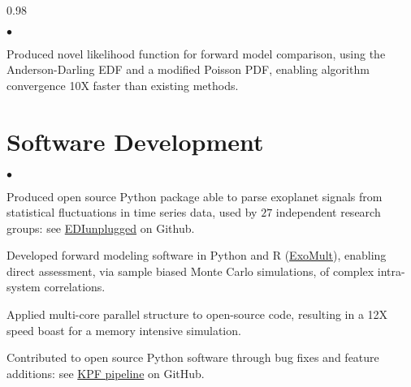 \documentclass[margin,line, 12pt]{res}
\newenvironment{list2}{
  \begin{list}{$\bullet$}{%
      \setlength{\itemsep}{0.04in}
      \setlength{\parsep}{0.00in} \setlength{\parskip}{0in}
      \setlength{\topsep}{0.0in} \setlength{\partopsep}{0in}
      \setlength{\leftmargin}{0.2in}}}{\end{list}}
\begin{document}
\begin{spacing}{0.98}
\begin{resume}
\begin{list2}
	\item Produced novel likelihood function for forward model comparison, using the Anderson-Darling EDF and a modified Poisson PDF, enabling algorithm convergence 10X faster than existing methods.    
	

    \end{list2}
\vspace*{-2mm}

\section{Software Development}
	\begin{list2}
	\item Produced open source Python package able to parse exoplanet signals from statistical fluctuations in time series data, used by $27$ independent research groups: see \href{https://github.com/jonzink/EDI_Vetter_unplugged}{EDIunplugged} on Github.
	
	\item Developed forward modeling software in Python and R (\href{https://github.com/jonzink/ExoMult}{ExoMult}), enabling direct assessment, via sample biased Monte Carlo simulations, of complex intra-system correlations.
	
	
	\item Applied multi-core parallel structure to open-source code, resulting in a 12X speed boast for a memory intensive simulation.
		
	\item Contributed to open source Python software through bug fixes and feature additions: see \href{https://github.com/California-Planet-Search/KPF-CPS}{KPF pipeline} on GitHub.
	\end{list2}
	


\end{resume}
\end{spacing}
\end{document}
